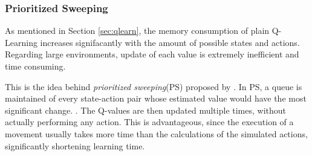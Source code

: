 \documentclass[a4paper]{article}
\begin{document}
	\subsubsection{Prioritized Sweeping}
	As mentioned in Section \ref{sec:qlearn}, the memory consumption of plain Q-Learning increases signifacantly with the amount of possible states and actions. Regarding large environments, update of each value is extremely inefficient and time consuming.
	\par This is the idea behind \textit{prioritized sweeping}(PS) proposed by \citet{Moore93}. In PS, a queue is maintained of every state-action pair whose estimated value would have the most significant change. \citep{Sutton1998}. The Q-values are then updated multiple times, without actually performing any action. This is advantageous, since the execution of a movement usually takes more time than the calculations of the simulated actions, significantly shortening learning time.
	
\end{document}
